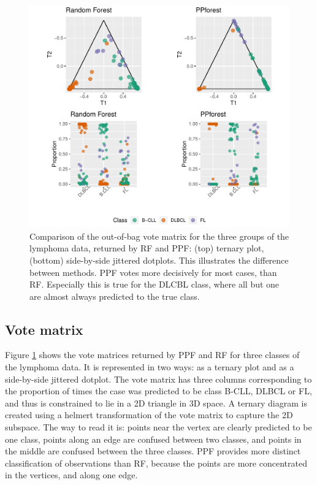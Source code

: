 \documentclass[12pt]{article}\usepackage[]{graphicx}\usepackage[]{color}
\makeatletter
\def\maxwidth{ %
  \ifdim\Gin@nat@width>\linewidth
    \linewidth
  \else
    \Gin@nat@width
  \fi
}
\newenvironment{knitrout}{}{} %
\makeatother
\begin{document}
\begin{figure}
\centering

\begin{knitrout}
\color{fgcolor}
\includegraphics[width=\maxwidth]{figure/side-1} 

\end{knitrout}
\caption{Comparison of the out-of-bag vote  matrix for the three groups of the lymphoma data, returned by RF and PPF: (top) ternary plot, (bottom) side-by-side jittered dotplots. This illustrates the difference between methods. PPF votes more decisively for most cases, than RF. Especially this is true for the DLCBL class, where all but one are almost always predicted to the true class.}
\label{voteplots}
\end{figure}

\subsection{Vote matrix}

Figure \ref{voteplots} shows the vote matrices returned by PPF and RF for three classes of the lymphoma data. It is represented in two ways: as a ternary plot and as a side-by-side jittered  dotplot. The vote matrix has three columns corresponding to the proportion of times the case was predicted to be class B-CLL, DLBCL or FL, and thus is constrained to lie in a 2D triangle in 3D space. A ternary diagram is created using a helmert transformation of the vote matrix to capture the 2D subspace. The way to read it is: points near the vertex are clearly predicted to be one class, points along an edge are confused between two classes, and points in the middle are confused between the three classes. PPF provides more distinct classification of observations than RF, because the points are more concentrated in the vertices, and along one edge.
\end{document}
